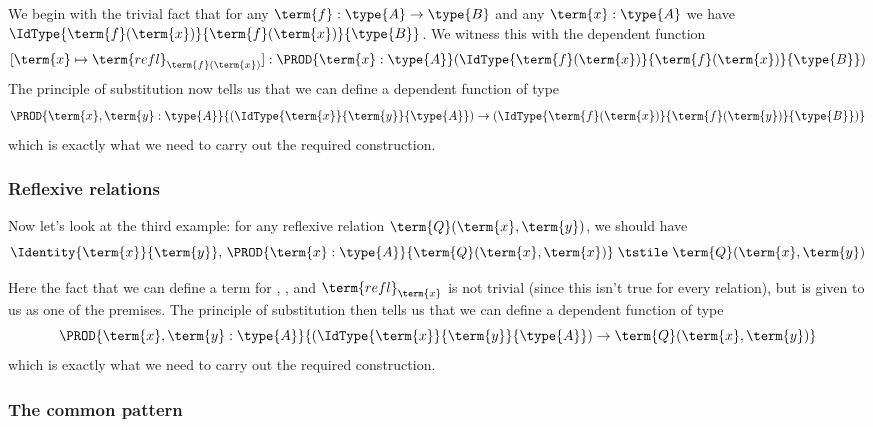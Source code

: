 We begin with the trivial fact that for any $\term{f}: \type{A} \to \type{B}$ and any $\term{x}:\type{A}$ we have
$\IdType
{\term{f}(\term{x})}
{\term{f}(\term{x})}
{\type{B}}$.  We witness this with the dependent function
\[
[\term{x} \mapsto \term{refl}_{\term{f}(\term{x})}]:
\PROD{\term{x}:\type{A}}
(\IdType
{\term{f}(\term{x})}
{\term{f}(\term{x})}
{\type{B}})
\]
The principle of substitution now tells us that we can define a dependent function of type 
\[
\PROD{\term{x},\term{y}:\type{A}}
{(\IdType{\term{x}}{\term{y}}{\type{A}}) \to 
(\IdType
{\term{f}(\term{x})}
{\term{f}(\term{y})}
{\type{B}})}
\]
which is exactly what we need to carry out the required construction.

\subsubsection{Reflexive relations}

Now let's look at the third example: for any reflexive relation $\term{Q}(\term{x},\term{y})$, 
we should have
\[
\Identity{\term{x}}{\term{y}}, \,
\PROD{\term{x}:\type{A}}
{\term{Q}(\term{x},\term{x})}
	\;\tstile\;
{\term{Q}(\term{x},\term{y})}
\]

Here the fact that we can define a term for , , and $\term{refl}_{\term{x}}$ is not trivial (since this isn't true for every relation), but is given to us as one of the premises.  The principle of substitution then tells us that we can define a dependent function of type
\[
\PROD{\term{x},\term{y}:\type{A}}
{(\IdType{\term{x}}{\term{y}}{\type{A}}) \to 
\term{Q}(\term{x},\term{y})}
\]
which is exactly what we need to carry out the required construction.



\newpage
\subsubsection{The common pattern}

